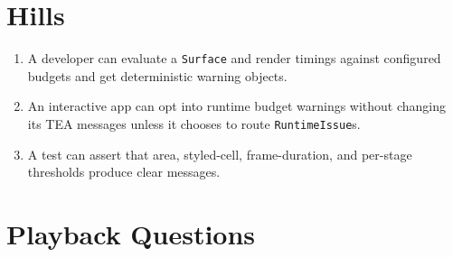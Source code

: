 \section{Hills}\label{record-157-hills}

\begin{enumerate}
\def\labelenumi{\arabic{enumi}.}
\tightlist
\item
  A developer can evaluate a \texttt{S\allowbreak{}u\allowbreak{}r\allowbreak{}f\allowbreak{}a\allowbreak{}c\allowbreak{}e} and render timings against configured budgets and get deterministic warning objects.
\item
  An interactive app can opt into runtime budget warnings without changing its TEA messages unless it chooses to route \texttt{R\allowbreak{}u\allowbreak{}n\allowbreak{}t\allowbreak{}i\allowbreak{}m\allowbreak{}e\allowbreak{}I\allowbreak{}s\allowbreak{}s\allowbreak{}u\allowbreak{}e}s.
\item
  A test can assert that area, styled-cell, frame-duration, and per-stage thresholds produce clear messages.
\end{enumerate}

\section{Playback Questions}\label{record-157-playback-questions}

